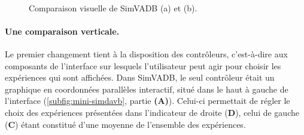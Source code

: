 \begin{figure}[H]
	\centering
	\\[-1.5ex]
	\hspace{1pt}
	\vspace{-0.3cm}
	\caption[Comparaison visuelle de SimVADB et \simedb{}.]{Comparaison visuelle de SimVADB (a) et \simedb{} (b).}
	\label{fig:comparaison-simvadb-simedb}
\end{figure}


\paragraph{Une comparaison verticale.}

Le premier changement tient à la disposition des \og contrôleurs\fg{}, c'est-à-dire aux composants de l'interface sur lesquels l'utilisateur peut agir pour choisir les expériences qui sont affichées.
Dans SimVADB, le seul contrôleur était un graphique en coordonnées parallèles interactif, situé dans le haut à gauche de l'interface (\cref{subfig:mini-simdavb}, partie \textbf{(A)}).
Celui-ci permettait de régler le choix des expériences présentées dans l'indicateur de droite (\textbf{D}), celui de gauche (\textbf{C}) étant constitué d'une moyenne de l'ensemble des expériences.

